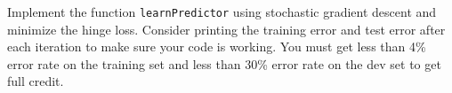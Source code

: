 \item {}

Implement the function {\tt learnPredictor} using stochastic gradient
descent and minimize the hinge loss. Consider printing the training error and
test error after each iteration to make sure your code is working. You must get
less than 4\% error rate on the training set and less than 30\% error rate on
the dev set to get full credit.
